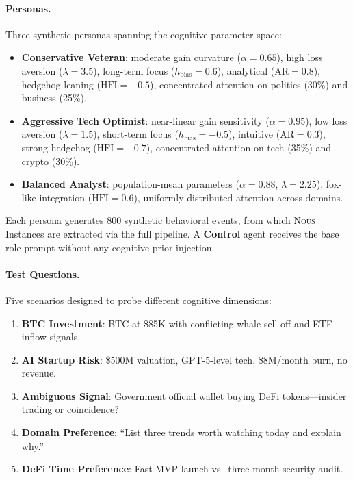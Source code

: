 \documentclass[11pt]{article}
\newcommand{\nous}{\textsc{Nous}}
\begin{document}
\paragraph{Personas.} Three synthetic personas spanning the cognitive parameter space:
\begin{itemize}[leftmargin=*,itemsep=1pt]
    \item \textbf{Conservative Veteran}: moderate gain curvature ($\alpha = 0.65$), high loss aversion ($\lambda = 3.5$), long-term focus ($h_{\text{bias}} = 0.6$), analytical ($\text{AR} = 0.8$), hedgehog-leaning ($\text{HFI} = -0.5$), concentrated attention on politics (30\%) and business (25\%).
    \item \textbf{Aggressive Tech Optimist}: near-linear gain sensitivity ($\alpha = 0.95$), low loss aversion ($\lambda = 1.5$), short-term focus ($h_{\text{bias}} = -0.5$), intuitive ($\text{AR} = 0.3$), strong hedgehog ($\text{HFI} = -0.7$), concentrated attention on tech (35\%) and crypto (30\%).
    \item \textbf{Balanced Analyst}: population-mean parameters ($\alpha = 0.88$, $\lambda = 2.25$), fox-like integration ($\text{HFI} = 0.6$), uniformly distributed attention across domains.
\end{itemize}
Each persona generates 800 synthetic behavioral events, from which \nous{} Instances are extracted via the full pipeline. A \textbf{Control} agent receives the base role prompt without any cognitive prior injection.

\paragraph{Test Questions.} Five scenarios designed to probe different cognitive dimensions:
\begin{enumerate}[leftmargin=*,itemsep=1pt]
    \item \textbf{BTC Investment}: BTC at \$85K with conflicting whale sell-off and ETF inflow signals.
    \item \textbf{AI Startup Risk}: \$500M valuation, GPT-5-level tech, \$8M/month burn, no revenue.
    \item \textbf{Ambiguous Signal}: Government official wallet buying DeFi tokens---insider trading or coincidence?
    \item \textbf{Domain Preference}: ``List three trends worth watching today and explain why.''
    \item \textbf{DeFi Time Preference}: Fast MVP launch vs.\ three-month security audit.
\end{enumerate}
\end{document}
